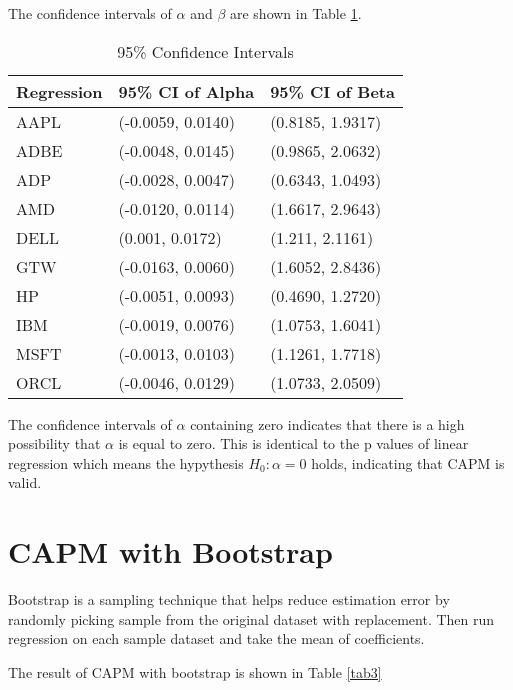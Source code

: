 \documentclass[11pt, conference]{IEEEtran}
\begin{document}
The confidence intervals of $\alpha$ and $\beta$ are shown in Table \ref{tab2}. 

\begin{table}[!t]
\centering
\caption{95\% Confidence Intervals}
\label{tab2}
\begin{tabular}{lll}
\hline
Regression & 95\% CI of Alpha  & 95\% CI of Beta  \\
\hline
AAPL       & (-0.0059, 0.0140) & (0.8185, 1.9317) \\
ADBE       & (-0.0048, 0.0145) & (0.9865, 2.0632) \\
ADP        & (-0.0028, 0.0047) & (0.6343, 1.0493) \\
AMD        & (-0.0120, 0.0114) & (1.6617, 2.9643) \\
DELL       & (0.001, 0.0172)   & (1.211, 2.1161)  \\
GTW        & (-0.0163, 0.0060) & (1.6052, 2.8436) \\
HP         & (-0.0051, 0.0093) & (0.4690, 1.2720) \\
IBM        & (-0.0019, 0.0076) & (1.0753, 1.6041) \\
MSFT       & (-0.0013, 0.0103) & (1.1261, 1.7718) \\
ORCL       & (-0.0046, 0.0129) & (1.0733, 2.0509) \\
\hline
\end{tabular}
\end{table}

The confidence intervals of $\alpha$ containing zero indicates that there is a high possibility that $\alpha$ is equal to zero. This is identical to the p values of linear regression which means the hypythesis $H_0: \alpha = 0$ holds, indicating that CAPM is valid. 

\section{CAPM with Bootstrap}
Bootstrap is a sampling technique that helps reduce estimation error by randomly picking sample from the original dataset with replacement. Then run regression on each sample dataset and take the mean of coefficients. 

The result of CAPM with bootstrap is shown in Table \ref{tab3}
\end{document}
